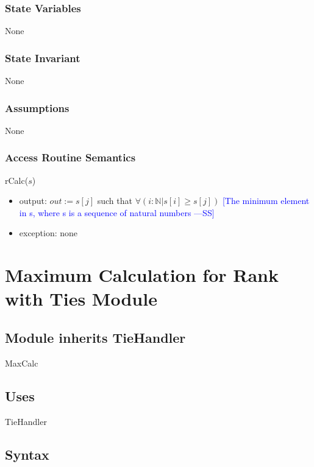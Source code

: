 \documentclass[12pt,fleqn]{examtst}
\newcommand{\authornote}[3]{\textcolor{#1}{[#3 ---#2]}}
\newcommand{\authornote}[3]{}
\newcommand{\wss}[1]{\authornote{blue}{SS}{#1}}
\begin{document}
\subsubsection* {State Variables}

None

\subsubsection* {State Invariant}

None

\subsubsection* {Assumptions}

None

\subsubsection* {Access Routine Semantics}

rCalc($s$)
\begin{itemize}
\item output: $out :=  s[j]$ such that $\forall(i: \mathbb{N} | s[i] \ge s[j])$
 \wss{The minimum element in s, where s is a sequence of natural numbers}
\item exception: none
\end{itemize}


\newpage

\section* {Maximum Calculation for Rank with Ties Module}

\subsection*{Module inherits TieHandler}

MaxCalc

\subsection* {Uses}

TieHandler

\subsection* {Syntax}
\end{document}
